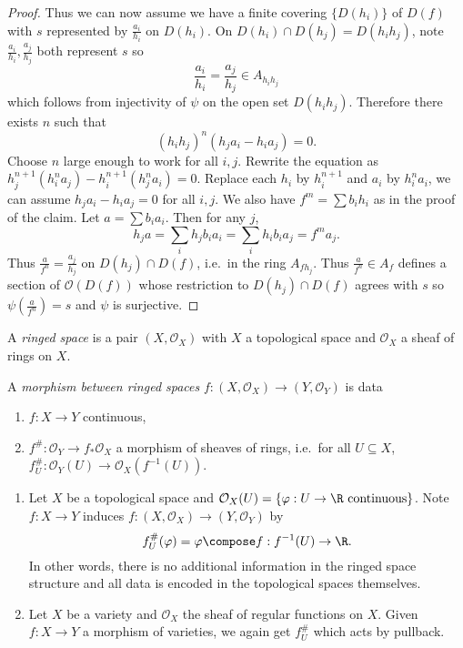 \documentclass[a4paper]{article}
\newcommand{\sh}[1]{\mathcal{#1}} %
\begin{document}
\begin{proof}
  Thus we can now assume we have a finite covering \(\{D(h_i)\}\) of \(D(f)\) with \(s\) represented by \(\frac{a_i}{h_i}\) on \(D(h_i)\). On \(D(h_i) \cap D(h_j) = D(h_i h_j)\), note \(\frac{a_i}{h_i}, \frac{a_j}{h_j}\) both represent \(s\) so
  \[
    \frac{a_i}{h_i} = \frac{a_j}{h_j} \in A_{h_ih_j}
  \]
  which follows from injectivity of \(\psi\) on the open set \(D(h_ih_j)\). Therefore there exists \(n\) such that
  \[
    (h_ih_j)^n (h_j a_i - h_i a_j) = 0.
  \]
  Choose \(n\) large enough to work for all \(i, j\). Rewrite the equation as \(h_j^{n + 1} (h_i^n a_j) - h_i^{n + 1} (h_j^n a_i) = 0\). Replace each \(h_i\) by \(h_i^{n + 1}\) and \(a_i\) by \(h_i^n a_i\), we can assume \(h_ja_i - h_ia_j = 0\) for all \(i, j\). We also have \(f^m = \sum b_ih_i\) as in the proof of the claim. Let \(a = \sum b_i a_i\). Then for any \(j\),
  \[
    h_j a = \sum_i h_jb_ia_i = \sum_i h_ib_ia_j = f^m a_j.
  \]
  Thus \(\frac{a}{f^n} = \frac{a_j}{h_j}\) on \(D(h_j) \cap D(f)\), i.e.\ in the ring \(A_{fh_j}\). Thus \(\frac{a}{f^n} \in A_f\) defines a section of \(\sh O(D(f))\) whose restriction to \(D(h_j) \cap D(f)\) agrees with \(s\) so \(\psi(\frac{a}{f^n}) = s\) and \(\psi\) is surjective.
\end{proof}

\begin{definition}
  A \emph{ringed space} is a pair \((X, \sh O_X)\) with \(X\) a topological space and \(\sh O_X\) a sheaf of rings on \(X\).

  A \emph{morphism between ringed spaces} \(f: (X, \sh O_X) \to (Y, \sh O_Y)\) is data
  \begin{enumerate}
  \item \(f: X \to Y\) continuous,
  \item \(f^\#: \sh O_Y \to f_* \sh O_X\) a morphism of sheaves of rings, i.e.\ for all \(U \subseteq X\), \(f_U^\#: \sh O_Y(U) \to \sh O_X(f^{-1}(U))\).
  \end{enumerate}
\end{definition}

\begin{eg}\leavevmode
  \begin{enumerate}
  \item Let \(X\) be a topological space and \(\sh O_X(U) = \{\varphi: U \to \R \text{ continuous}\}\). Note \(f: X \to Y\) induces \(f: (X, \sh O_X) \to (Y, \sh O_Y)\) by
    \[
      f_U^\#(\varphi) = \varphi \compose f: f^{-1}(U) \to \R.
    \]
    In other words, there is no additional information in the ringed space structure and all data is encoded in the topological spaces themselves.
  \item Let \(X\) be a variety and \(\sh O_X\) the sheaf of regular functions on \(X\). Given \(f: X \to Y\) a morphism of varieties, we again get \(f_U^\#\) which acts by pullback.
  \end{enumerate}
\end{eg}
\end{document}
